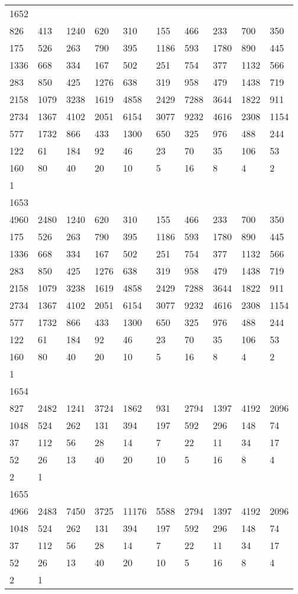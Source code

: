 \begin{longtable}{*{10}{l}}
1652&&&&&&&&&\\
826& 413& 1240& 620& 310& 155& 466& 233& 700& 350\\
175& 526& 263& 790& 395& 1186& 593& 1780& 890& 445\\
1336& 668& 334& 167& 502& 251& 754& 377& 1132& 566\\
283& 850& 425& 1276& 638& 319& 958& 479& 1438& 719\\
2158& 1079& 3238& 1619& 4858& 2429& 7288& 3644& 1822& 911\\
2734& 1367& 4102& 2051& 6154& 3077& 9232& 4616& 2308& 1154\\
577& 1732& 866& 433& 1300& 650& 325& 976& 488& 244\\
122& 61& 184& 92& 46& 23& 70& 35& 106& 53\\
160& 80& 40& 20& 10& 5& 16& 8& 4& 2\\
1& \\

1653&&&&&&&&&\\
4960& 2480& 1240& 620& 310& 155& 466& 233& 700& 350\\
175& 526& 263& 790& 395& 1186& 593& 1780& 890& 445\\
1336& 668& 334& 167& 502& 251& 754& 377& 1132& 566\\
283& 850& 425& 1276& 638& 319& 958& 479& 1438& 719\\
2158& 1079& 3238& 1619& 4858& 2429& 7288& 3644& 1822& 911\\
2734& 1367& 4102& 2051& 6154& 3077& 9232& 4616& 2308& 1154\\
577& 1732& 866& 433& 1300& 650& 325& 976& 488& 244\\
122& 61& 184& 92& 46& 23& 70& 35& 106& 53\\
160& 80& 40& 20& 10& 5& 16& 8& 4& 2\\
1& \\

1654&&&&&&&&&\\
827& 2482& 1241& 3724& 1862& 931& 2794& 1397& 4192& 2096\\
1048& 524& 262& 131& 394& 197& 592& 296& 148& 74\\
37& 112& 56& 28& 14& 7& 22& 11& 34& 17\\
52& 26& 13& 40& 20& 10& 5& 16& 8& 4\\
2& 1& \\

1655&&&&&&&&&\\
4966& 2483& 7450& 3725& 11176& 5588& 2794& 1397& 4192& 2096\\
1048& 524& 262& 131& 394& 197& 592& 296& 148& 74\\
37& 112& 56& 28& 14& 7& 22& 11& 34& 17\\
52& 26& 13& 40& 20& 10& 5& 16& 8& 4\\
2& 1& \\


\end{longtable}
